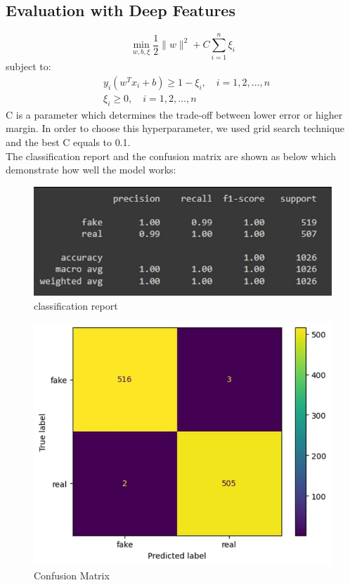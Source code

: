 \documentclass{template}
\begin{document}
\subsection{Evaluation with Deep Features}
\begin{equation*}
\min_{w, b, \xi} \frac{1}{2}\|w\|^2 + C\sum_{i=1}^{n}\xi_i
\end{equation*}
subject to:
\begin{align*}
& y_i(w^T x_i + b) \geq 1 - \xi_i, \quad i = 1, 2, \ldots, n \\
& \xi_i \geq 0, \quad i = 1, 2, \ldots, n
\end{align*}
C is a parameter which determines the trade-off between lower error or higher margin. In order to choose this hyperparameter, we used grid search technique and the best C equals to 0.1.\\
The classification report and the confusion matrix are shown as below which demonstrate how well the model works:
\begin{figure}
\includegraphics[scale=0.75]{svm1.jpg}
\caption{classification report}
\label{fig:logo}
\end{figure}
\begin{figure}
\includegraphics[scale=0.7]{svm2.jpg}
\caption{Confusion Matrix}
\label{fig:logo}
\end{figure}
\end{document}
